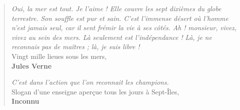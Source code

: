 \thispagestyle{empty}

\begin{minipage}[l]{0.45\textwidth}

\end{minipage}%
\hfill
\begin{minipage}[r]{0.5\textwidth}
\begin{quotation}
\begin{doublespace}

\guillemotleft \textit{Oui, la mer est tout. Je l'aime ! Elle couvre les sept dixièmes du globe terrestre. Son souffle est pur et sain. C'est l'immense désert où l'homme n'est jamais seul, car il sent frémir la vie à ses côtés. Ah ! monsieur, vivez, vivez au sein des mers. Là seulement est l'indépendance ! Là, je ne reconnais pas de maîtres ; là, je suis libre !} \guillemotright \\
Vingt mille lieues sous les mers, \\
\textbf{Jules Verne}

\vspace{15mm}

\guillemotleft \textit{ C'est dans l'action que l'on reconnait les champions.} \guillemotright \\
Slogan d'une enseigne aperçue tous les jours à Sept-Îles, \\
\textbf{Inconnu}

\end{doublespace}
\end{quotation}
\end{minipage}%

\cleardoublepage
